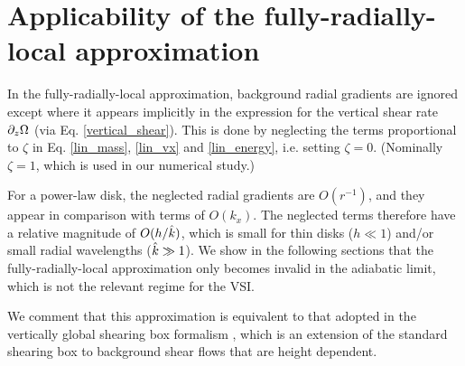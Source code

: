 


      



\section{Applicability of the fully-radially-local approximation}\label{global_corr}
In the fully-radially-local approximation, background radial
gradients are ignored except where it appears
implicitly in the expression for the vertical shear rate $\partial_z\Omega$
(via Eq. \ref{vertical_shear}).  This is done by neglecting the terms proportional to $\zeta$
in Eq. \ref{lin_mass}, \ref{lin_vx} and \ref{lin_energy}, i.e. setting 
$\zeta=0$. (Nominally $\zeta=1$, which is used in our numerical study.) 


For a power-law disk, the neglected radial gradients   
are $O(r^{-1})$, and they appear in comparison with terms of
$O(k_x)$. The neglected terms therefore have a relative magnitude of
$O(h/\hat{k})$, which is small for thin disks ($h\ll1$) 
and/or small radial wavelengths ($\hat{k}\gg 1$).  We show in the
following sections that the fully-radially-local approximation only 
becomes invalid in the adiabatic limit, which is not the relevant
regime for the VSI. 

We comment that this approximation is equivalent to 
that adopted in the vertically global shearing box formalism
, which is an 
extension of the standard shearing box \citep{goldreich65} to
background shear flows that are height dependent.

